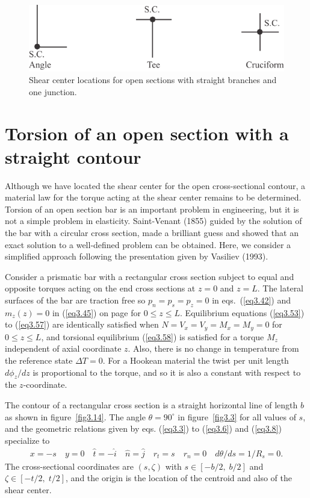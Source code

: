 \documentclass{AeroStructure-ERJohnson}
\begin{document}
{\def\thefigure{3.13}
\begin{figure}[!h]
\centerline{\includegraphics{Figure_3-13.pdf}}
\caption{Shear center locations for open sections with straight branches and one junction.}\label{fig3.13}
\end{figure}}

\vspace*{-1pc}
\setcounter{equation}{106}
\section{Torsion of an open section with a straight contour}\label{sec3.9}

Although we have located the shear center for the open cross-sectional contour, a material law for the torque acting at the shear center remains to be determined. Torsion of an open section bar is an important problem in engineering, but it is not a simple problem in elasticity. Saint-Venant (1855) guided by the solution of the bar with a circular cross section, made a brilliant guess and showed that an exact solution to a well-defined problem can be obtained. Here, we consider a simplified approach following the presentation given by Vasiliev (1993).

Consider a prismatic bar with a rectangular cross section subject to equal and opposite torques acting on the end cross sections at $z=0$ and $z=L$. The lateral surfaces of the bar are traction free so $p_n = p_s = p_z =0$ in eqs.~(\ref{eq3.42}) and $m_z (z) = 0$ in  (\ref{eq3.45}) on page \pageref{eq3.44} for $0 \leq z \leq L$. Equilibrium equations (\ref{eq3.53}) to (\ref{eq3.57}) are identically satisfied when $N=V_{x}=V_{y}=M_{x}=M_{y}=0$ for $0 \leq z \leq L$, and torsional equilibrium (\ref{eq3.58}) is satisfied for a torque $M_{z}$ independent of axial coordinate $z$. Also, there is no change in temperature from the reference state $\Delta T=0$. For a Hookean material the twist per unit length $d \phi_{z} / d z$ is proportional to the torque, and so it is also a constant with respect to the $z$-coordinate.


The contour of a rectangular cross section is a straight horizontal line of length $b$ as shown in figure~\ref{fig3.14}. The angle $\theta=90^{\circ}$ in figure~\ref{fig3.3} for all values of $s$, and the geometric relations given by eqs. (\ref{eq3.3}) to (\ref{eq3.6}) and (\ref{eq3.8}) specialize to
\begin{align*}
x=-s \quad y=0 \quad \hat{t}=-\hat{i} \quad \hat{n}=\hat{j} \quad r_{t}=s \quad r_{n}=0 \quad d \theta / d s=1 / R_{s}=0.
\end{align*}
The cross-sectional coordinates are $(s, \zeta)$ with $s \in[-b / 2,\; b / 2]$ and $\zeta \in[-t / 2,\; t / 2]$, and the origin is the location of the centroid and also of the shear center.
\end{document}
